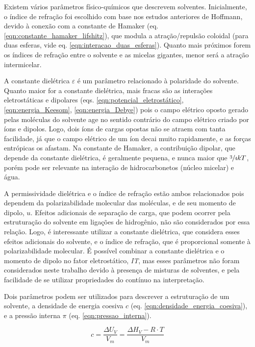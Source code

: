 		
		Existem vários parâmetros físico-químicos que descrevem solventes. Inicialmente, o índice de refração foi escolhido com base nos estudos anteriores de Hoffmann, devido à conexão com a constante de Hamaker (eq. \ref{eqn:constante_hamaker_lifshitz}), que modula a atração/repulsão coloidal (para duas esferas, vide eq. \ref{eqn:interacao_duas_esferas}). Quanto mais próximos forem os índices de refração entre o solvente e as micelas gigantes, menor será a atração intermicelar.
		
		A constante dielétrica \(\varepsilon\) é um parâmetro relacionado à polaridade do solvente. Quanto maior for a constante dielétrica, mais fracas são as interações eletrostáticas e dipolares (eqs. \ref{eqn:potencial_eletrostático}, \ref{eqn:energia_Keesom}, \ref{eqn:energia_Debye}) pois o campo elétrico oposto gerado pelas moléculas do solvente age no sentido contrário do campo elétrico criado por íons e dipolos. Logo, dois íons de cargas opostas não se atraem com tanta facilidade, já que o campo elétrico de um íon decai muito rapidamente, e as forças entrópicas os afastam. Na constante de Hamaker, a contribuição dipolar, que depende da constante dielétrica, é geralmente pequena, e nunca maior que \(\sfrac{3}{4}kT\), porém pode ser relevante na interação de hidrocarbonetos (núcleo micelar) e água.
		
		A permissividade dielétrica e o índice de refração estão ambos relacionados pois dependem da polarizabilidade molecular das moléculas, e de seu momento de dipolo, \(u\). Efeitos adicionais de separação de carga, que podem ocorrer pela estruturação do solvente em ligações de hidrogênio, não são considerados por essa relação. Logo, é interessante utilizar a constante dielétrica, que considera esses efeitos adicionais do solvente, e o índice de refração, que é proporcional somente à polarizabilidade molecular. É possível combinar a constante dielétrica e o momento de dipolo no fator eletrostático, \emph{IT}, mas esses parâmetros não foram considerados neste trabalho devido à presença de misturas de solventes, e pela facilidade de se utilizar propriedades do contínuo na interpretação. %
		
		Dois parâmetros podem ser utilizados para descrever a estruturação de um solvente, a densidade de energia coesiva \(c\) (eq. \ref{eqn:densidade_energia_coesiva}), e a pressão interna \(\pi\) (eq. \ref{eqn:pressao_interna}).  %
		
		\begin{equation}
			c = \dfrac{\Delta U_V}{V_m} = \dfrac{\Delta H_V - R\cdot T}{V_m}
			\label{eqn:densidade_energia_coesiva}
		\end{equation}
		
